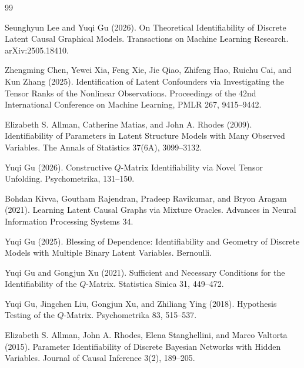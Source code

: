 \documentclass{article}
\begin{document}
\begin{thebibliography}{99}

   Seunghyun Lee and Yuqi Gu (2026). On Theoretical Identifiability of Discrete Latent Causal Graphical Models. Transactions on Machine Learning Research. arXiv:2505.18410.

   Zhengming Chen, Yewei Xia, Feng Xie, Jie Qiao, Zhifeng Hao, Ruichu Cai, and Kun Zhang (2025). Identification of Latent Confounders via Investigating the Tensor Ranks of the Nonlinear Observations. Proceedings of the 42nd International Conference on Machine Learning, PMLR 267, 9415--9442.

   Elizabeth S. Allman, Catherine Matias, and John A. Rhodes (2009). Identifiability of Parameters in Latent Structure Models with Many Observed Variables. The Annals of Statistics 37(6A), 3099--3132.

   Yuqi Gu (2026). Constructive \(Q\)-Matrix Identifiability via Novel Tensor Unfolding. Psychometrika, 131--150.

   Bohdan Kivva, Goutham Rajendran, Pradeep Ravikumar, and Bryon Aragam (2021). Learning Latent Causal Graphs via Mixture Oracles. Advances in Neural Information Processing Systems 34.

   Yuqi Gu (2025). Blessing of Dependence: Identifiability and Geometry of Discrete Models with Multiple Binary Latent Variables. Bernoulli.

   Yuqi Gu and Gongjun Xu (2021). Sufficient and Necessary Conditions for the Identifiability of the \(Q\)-Matrix. Statistica Sinica 31, 449--472.

   Yuqi Gu, Jingchen Liu, Gongjun Xu, and Zhiliang Ying (2018). Hypothesis Testing of the \(Q\)-Matrix. Psychometrika 83, 515--537.

   Elizabeth S. Allman, John A. Rhodes, Elena Stanghellini, and Marco Valtorta (2015). Parameter Identifiability of Discrete Bayesian Networks with Hidden Variables. Journal of Causal Inference 3(2), 189--205.

\end{thebibliography}
\end{document}
